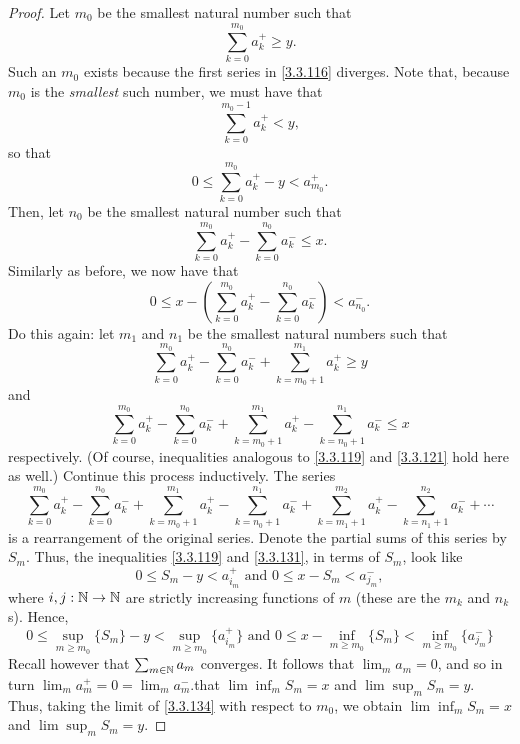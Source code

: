 \begin{thm}
\begin{proof}
Let $m_0$ be the smallest natural number such that
\begin{equation}
\sum _{k=0}^{m_0}a_k^+\geq y.
\end{equation}
Such an $m_0$ exists because the first series in \eqref{3.3.116} diverges.  Note that, because $m_0$ is the \emph{smallest} such number, we must have that 
\begin{equation}
\sum _{k=0}^{m_0-1}a_k^+<y,
\end{equation}
so that
\begin{equation}\label{3.3.119}
0\leq \sum _{k=0}^{m_0}a_k^+-y<a_{m_0}^+.
\end{equation}
Then, let $n_0$ be the smallest natural number such that
\begin{equation}
\sum _{k=0}^{m_0}a_k^+-\sum _{k=0}^{n_0}a_k^-\leq x.
\end{equation}
Similarly as before, we now have that
\begin{equation}\label{3.3.121}
0\leq x-\left( \sum _{k=0}^{m_0}a_k^+-\sum _{k=0}^{n_0}a_k^-\right) <a_{n_0}^-.
\end{equation}
Do this again:  let $m_1$ and $n_1$ be the smallest natural numbers such that
\begin{equation}\label{3.3.130}
\sum _{k=0}^{m_0}a_k^+-\sum _{k=0}^{n_0}a_k^-+\sum _{k=m_0+1}^{m_1}a_k^+\geq y
\end{equation}
and
\begin{equation}\label{3.3.131}
\sum _{k=0}^{m_0}a_k^+-\sum _{k=0}^{n_0}a_k^-+\sum _{k=m_0+1}^{m_1}a_k^+-\sum _{k=n_0+1}^{n_1}a_k^-\leq x
\end{equation}
respectively.  (Of course, inequalities analogous to \eqref{3.3.119} and \eqref{3.3.121} hold here as well.)  Continue this process inductively.  The series
\begin{equation}
\sum _{k=0}^{m_0}a_k^+-\sum _{k=0}^{n_0}a_k^-+\sum _{k=m_0+1}^{m_1}a_k^+-\sum _{k=n_0+1}^{n_1}a_k^-+\sum _{k=m_1+1}^{m_2}a_k^+-\sum _{k=n_1+1}^{n_2}a_k^-+\cdots
\end{equation}
is a rearrangement of the original series.  Denote the partial sums of this series by $S_m$.  Thus, the inequalities \eqref{3.3.119} and \eqref{3.3.131}, in terms of $S_m$, look like
\begin{equation}
0\leq S_m-y<a_{i_m}^+\text{ and }0\leq x-S_m<a_{j_m}^-,
\end{equation}
where $i,j:\mathbb{N} \rightarrow \mathbb{N}$ are strictly increasing functions of $m$ (these are the $m_k$ and $n_k$s).  Hence,
\begin{equation}\label{3.3.134}
0\leq \sup _{m\geq m_0}\{ S_m\}-y<\sup _{m\geq m_0}\{ a_{i_m}^+\} \text{ and }0\leq x-\inf _{m\geq m_0}\{ S_m\} <\inf _{m\geq m_0}\{ a_{j_m}^-\}
\end{equation}
Recall however that $\sum _{m\in \mathbb{N}}a_m$ converges.  It follows that $\lim _ma_m=0$, and so in turn $\lim _ma_m^+=0=\lim _ma_m^-$.that $\lim \inf _mS_m=x$ and $\lim \sup _mS_m=y$.  Thus, taking the limit of \eqref{3.3.134} with respect to $m_0$, we obtain $\lim \inf _mS_m=x$ and $\lim \sup _mS_m=y$.
\end{proof}
\end{thm}
